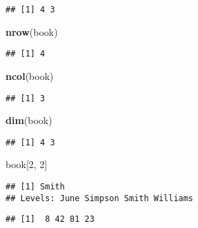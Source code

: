 \documentclass[]{article}
\newenvironment{Shaded}{\begin{snugshade}}{\end{snugshade}}
\newcommand{\DecValTok}[1]{\textcolor[rgb]{0.00,0.00,0.81}{#1}}
\newcommand{\KeywordTok}[1]{\textcolor[rgb]{0.13,0.29,0.53}{\textbf{#1}}}
\newcommand{\NormalTok}[1]{#1}
\newcommand{\OperatorTok}[1]{\textcolor[rgb]{0.81,0.36,0.00}{\textbf{#1}}}
\begin{document}
\begin{verbatim}
## [1] 4 3
\end{verbatim}

\begin{Shaded}
\begin{Highlighting}[]
\KeywordTok{nrow}\NormalTok{(book)}
\end{Highlighting}
\end{Shaded}

\begin{verbatim}
## [1] 4
\end{verbatim}

\begin{Shaded}
\begin{Highlighting}[]
\KeywordTok{ncol}\NormalTok{(book)}
\end{Highlighting}
\end{Shaded}

\begin{verbatim}
## [1] 3
\end{verbatim}

\begin{Shaded}
\begin{Highlighting}[]
\KeywordTok{dim}\NormalTok{(book)}
\end{Highlighting}
\end{Shaded}

\begin{verbatim}
## [1] 4 3
\end{verbatim}

\begin{Shaded}
\begin{Highlighting}[]
\NormalTok{book[}\DecValTok{2}\NormalTok{, }\DecValTok{2}\NormalTok{]}
\end{Highlighting}
\end{Shaded}

\begin{verbatim}
## [1] Smith
## Levels: June Simpson Smith Williams
\end{verbatim}

\begin{Shaded}
\end{Shaded}

\begin{verbatim}
## [1]  8 42 81 23
\end{verbatim}
\end{document}
